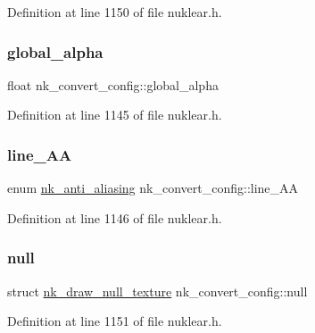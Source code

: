 Definition at line 1150 of file nuklear.\+h.

\mbox{\label{structnk__convert__config_ad344c555b0c1ce0a07dded48860ceb00}} 
\subsubsection{\texorpdfstring{global\+\_\+alpha}{global\_alpha}}
{\footnotesize\ttfamily float nk\+\_\+convert\+\_\+config\+::global\+\_\+alpha}



Definition at line 1145 of file nuklear.\+h.

\mbox{\label{structnk__convert__config_a7279543367b1ad0e5f183491233cedad}} 
\subsubsection{\texorpdfstring{line\+\_\+\+AA}{line\_AA}}
{\footnotesize\ttfamily enum \mbox{\hyperlink{nuklear_8h_a9b070460af54cd26421eb7d000956f38}{nk\+\_\+anti\+\_\+aliasing}} nk\+\_\+convert\+\_\+config\+::line\+\_\+\+AA}



Definition at line 1146 of file nuklear.\+h.

\mbox{\label{structnk__convert__config_af4200766d63d131134251aa67fe76579}} 
\subsubsection{\texorpdfstring{null}{null}}
{\footnotesize\ttfamily struct \mbox{\hyperlink{structnk__draw__null__texture}{nk\+\_\+draw\+\_\+null\+\_\+texture}} nk\+\_\+convert\+\_\+config\+::null}



Definition at line 1151 of file nuklear.\+h.

